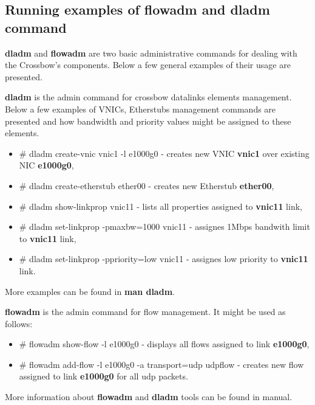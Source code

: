 \documentclass[11pt]{book}
\begin{document}
      \subsection{Running examples of flowadm and dladm command}

        \textbf{dladm} and \textbf{flowadm} are two basic administrative commands for dealing with the Crossbow's
        components. Below a few general examples of their usage are presented.
  
        \textbf{dladm} is the admin command for crossbow datalinks elements management. Below a few examples of VNICs,
        Etherstubs management commands are presented and how bandwidth and priority values might be assigned to these
        elements.
  
        \begin{itemize}
          \item \# dladm create-vnic vnic1 -l e1000g0 - creates new VNIC \textbf{vnic1} over existing NIC \textbf{e1000g0},
          \item \# dladm create-etherstub ether00 - creates new Etherstub \textbf{ether00},
          \item \# dladm show-linkprop vnic11 - lists all properties assigned to \textbf{vnic11} link,
          \item \# dladm set-linkprop -pmaxbw=1000 vnic11 - assignes 1Mbps bandwith limit to \textbf{vnic11} link,
          \item \# dladm set-linkprop -ppriority=low vnic11 - assignes low priority to \textbf{vnic11} link.
        \end{itemize}
  
        More examples can be found in \textbf{man dladm}.

        \medskip

        \textbf{flowadm} is the admin command for flow management. It might be used as follows:     

        \begin{itemize}
          \item \# flowadm show-flow -l e1000g0 - displays all flows assigned to link \textbf{e1000g0},
          \item \# flowadm add-flow -l e1000g0 -a transport=udp udpflow - creates new flow assigned to link
                \textbf{e1000g0} for all udp packets.
        \end{itemize}

        More information about \textbf{flowadm} and \textbf{dladm} tools can be found in manual.
\end{document}

